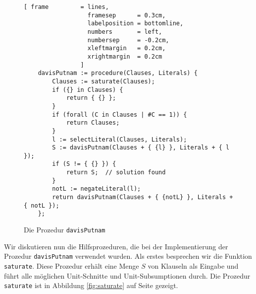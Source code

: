 \begin{figure}[!ht]
  \centering
\begin{Verbatim}[ frame         = lines, 
                  framesep      = 0.3cm, 
                  labelposition = bottomline,
                  numbers       = left,
                  numbersep     = -0.2cm,
                  xleftmargin   = 0.2cm,
                  xrightmargin  = 0.2cm
                ]
    davisPutnam := procedure(Clauses, Literals) {
        Clauses := saturate(Clauses);
        if ({} in Clauses) {
            return { {} };
        }
        if (forall (C in Clauses | #C == 1)) {
            return Clauses;
        }
        l := selectLiteral(Clauses, Literals);
        S := davisPutnam(Clauses + { {l} }, Literals + { l });
        if (S != { {} }) {
            return S;  // solution found
        }     
        notL := negateLiteral(l);    
        return davisPutnam(Clauses + { {notL} }, Literals + { notL });
    };
\end{Verbatim}
\vspace*{-0.3cm}
  \caption{Die Prozedur \texttt{davisPutnam}}
  \label{fig:davisPutnam}
\end{figure} 

Wir diskutieren nun die Hilfsprozeduren, die bei der Implementierung der Prozedur
\texttt{davisPutnam} verwendet wurden.
Als erstes besprechen wir die Funktion \texttt{saturate}.  Diese Prozedur erhält eine
Menge $S$ von Klauseln als Eingabe und führt alle möglichen Unit-Schnitte und
Unit-Subsumptionen durch.  
Die Prozedur \texttt{saturate} ist in Abbildung \ref{fig:saturate} auf Seite \pageref{fig:saturate}
gezeigt.

